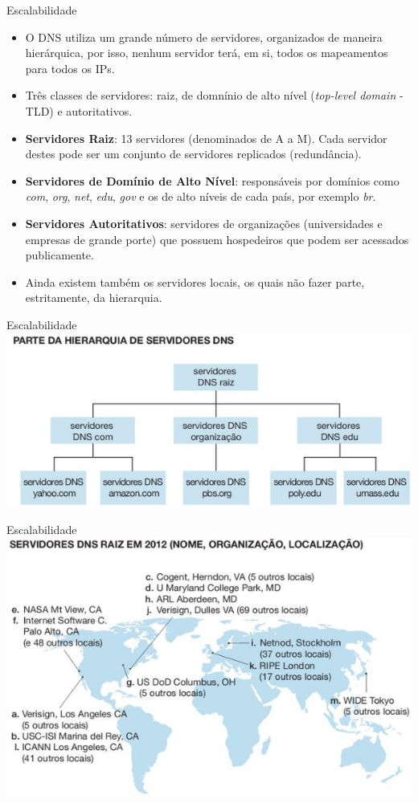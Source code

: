 \documentclass{libs/ufc_format}
\begin{document}
\begin{frame}{Escalabilidade}
    \begin{itemize}
        \justifying
        \item O DNS utiliza um grande número de servidores, organizados de maneira hierárquica, por isso, nenhum servidor terá, em si, todos os mapeamentos para todos os IPs.
        \item Três classes de servidores: raiz, de domnínio de alto nível (\textit{top-level domain} - TLD) e autoritativos.
        \item \textbf{Servidores Raiz}: 13 servidores (denominados de A a M). Cada servidor destes pode ser um conjunto de servidores replicados (redundância).
        \item<2-> \textbf{Servidores de Domínio de Alto Nível}: responsáveis por domínios como \textit{com}, \textit{org}, \textit{net}, \textit{edu}, \textit{gov} e os de alto níveis de cada país, por exemplo \textit{br}.
        \item<3-> \textbf{Servidores Autoritativos}: servidores de organizações (universidades e empresas de grande porte) que possuem hospedeiros que podem ser acessados publicamente.
        \item<4-> Ainda existem também os servidores locais, os quais não fazer parte, estritamente, da hierarquia.
    \end{itemize}
\end{frame}

\begin{frame}{Escalabilidade}
    \centering
    \includegraphics[scale=0.7]{figuras/figura04_09}
\end{frame}

\begin{frame}{Escalabilidade}
    \centering
    \includegraphics[scale=0.7]{figuras/figura04_10}
\end{frame}
\end{document}
